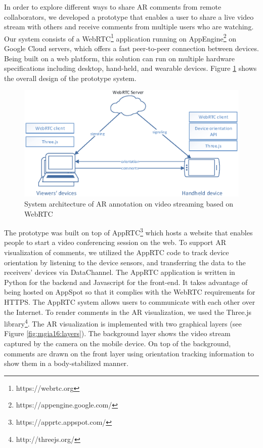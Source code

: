 In order to explore different ways to share AR comments from remote collaborators, we developed a prototype that enables a user to share a live video stream with others and receive comments from multiple users who are watching. Our system consists of a WebRTC\footnote{https://webrtc.org} application running on AppEngine\footnote{https://appengine.google.com/} on Google Cloud servers, which offers a fast peer-to-peer connection between devices. Being built on a web platform, this solution can run on multiple hardware specifications including desktop, hand-held, and wearable devices. Figure \ref{fig:mgia16:system} shows the overall design of the prototype system.

\begin{figure}[ht]
  \centering
  \includegraphics[width=\linewidth]{images/mgia16/system}
  \caption{System architecture of AR annotation on video streaming based on WebRTC}
	\label{fig:mgia16:system}
\end{figure}

The prototype was built on top of AppRTC\footnote{https://apprtc.appspot.com/} which hosts a website that enables people to start a video conferencing session on the web. To support AR visualization of comments, we utilized the AppRTC code to track device orientation by listening to the device sensors, and transferring the data to the receivers' devices via DataChannel. The AppRTC application is written in Python for the backend and Javascript for the front-end. It takes advantage of being hosted on AppSpot so that it complies with the WebRTC requirements for HTTPS. The AppRTC system allows users to communicate with each other over the Internet. To render comments in the AR visualization, we used the Three.js library\footnote{http://threejs.org/}. The AR visualization is implemented with two graphical layers (see Figure \ref{fig:mgia16:layers}). The background layer shows the video stream captured by the camera on the mobile device. On top of the background, comments are drawn on the front layer using orientation tracking information to show them in a body-stabilized manner. 

